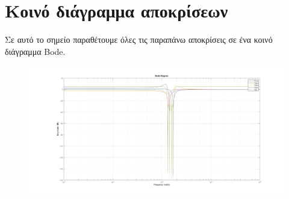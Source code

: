 \documentclass{article}
\begin{document}
{{\section*{Κοινό διάγραμμα αποκρίσεων} 
Σε αυτό το σημείο παραθέτουμε όλες τις παραπάνω αποκρίσεις σε ένα κοινό διάγραμμα Bode.
\begin{figure}[h!]
\centering
 	\advance\leftskip-4cm
  \includegraphics[width=200mm,scale=2]{thema3/matlab5.jpg}
\end{figure}  
\newpage
}}
\end{document}
